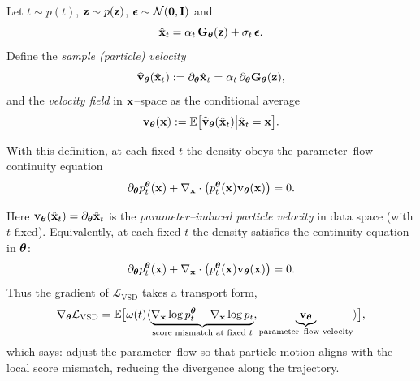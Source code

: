 Let $t\sim p(t)$, ${\mathbf{z}}\sim p({\mathbf{z}})$, ${\bm{\epsilon}}\sim\mathcal N(\bm{0},{\mathbf{I}})$ and
\[
\hat{{\mathbf{x}}}_t=\alpha_t\,{\mathbf{G}}_{\bm{\theta}}({\mathbf{z}})+\sigma_t\,{\bm{\epsilon}}.
\]
Define the \emph{sample (particle) velocity}
\[
\widehat{{\mathbf{v}}}_{\bm{\theta}}(\hat{{\mathbf{x}}}_t):=\partial_{\bm{\theta}} \hat{{\mathbf{x}}}_t=\alpha_t\,\partial_{\bm{\theta}} {\mathbf{G}}_{\bm{\theta}}({\mathbf{z}}),
\]
and the \emph{velocity field} in ${\mathbf{x}}$–space as the conditional average
\[
{\mathbf{v}}_{\bm{\theta}}({\mathbf{x}}):=\mathbb{E} \big[\widehat{{\mathbf{v}}}_{\bm{\theta}}(\hat{{\mathbf{x}}}_t) \big| \hat{{\mathbf{x}}}_t={\mathbf{x}}\big].
\]

With this definition, at each fixed $t$ the density obeys the parameter–flow continuity equation
\[
\partial_{\bm{\theta}} p_t^{{\bm{\theta}}}({\mathbf{x}})+\nabla_{{\mathbf{x}}}\cdot\big(p_t^{{\bm{\theta}}}({\mathbf{x}}) {\mathbf{v}}_{\bm{\theta}}({\mathbf{x}})\big)=0.
\]

Here ${\mathbf{v}}_{\bm{\theta}}(\hat{{\mathbf{x}}}_t)=\partial_{\bm{\theta}} \hat{{\mathbf{x}}}_t$ is the
\emph{parameter–induced particle velocity} in data space (with $t$ fixed).
Equivalently, at each fixed $t$ the density satisfies the continuity equation in ${\bm{\theta}}$:
\[
\partial_{\bm{\theta}} p_t^{{\bm{\theta}}}({\mathbf{x}}) + \nabla_{{\mathbf{x}}} \cdot \big(p_t^{{\bm{\theta}}}({\mathbf{x}}) {\mathbf{v}}_{\bm{\theta}}({\mathbf{x}})\big) = 0.
\]
Thus the gradient of $\mathcal{L}_{\text{VSD}}$ takes a transport form,
\[
\nabla_{{\bm{\theta}}}\mathcal{L}_{\text{VSD}}
= \mathbb{E}\big[\omega(t)\langle
\underbrace{\nabla_{{\mathbf{x}}}\log p_t^{{\bm{\theta}}}-\nabla_{{\mathbf{x}}}\log p_t}_{\text{score mismatch at fixed }t},
\underbrace{{\mathbf{v}}_{\bm{\theta}}}_{\text{parameter–flow velocity}}\rangle\big],
\]
which says: adjust the parameter–flow so that particle motion aligns with the local score mismatch,
reducing the divergence along the trajectory.








